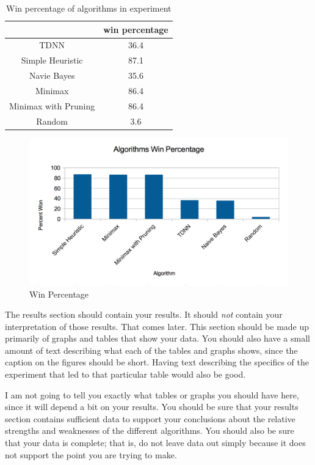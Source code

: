 \documentclass[12pt,letterpaper]{article}
\begin{document}
\begin{table}
\begin{center}
\begin{tabular}{|c||c|}
\hline
& win percentage\\
\hline \hline
TDNN & 36.4\\
\hline 
Simple Heuristic & 87.1\\
\hline 
Navie Bayes & 35.6\\
\hline 
Minimax & 86.4\\
\hline 
Minimax with Pruning & 86.4\\
\hline 
Random & 3.6\\
\hline 
\end{tabular}
\end{center}
\caption{Win percentage of algorithms in experiment}
\label{WinPercentTable}
\end{table}

\begin{figure}
\begin{center}
\includegraphics[width=7in]{winpercent.png}
\end{center}
\caption{Win Percentage}
\label{WinGraph}
\end{figure}

The results section should contain your results.  It should \emph{not} contain
your interpretation of those results.  That comes later.  This section should be
made up primarily of graphs and tables that show your data.  You should also
have a small amount of text describing what each of the tables and graphs shows,
since the caption on the figures should be short.  Having text describing the
specifics of the experiment that led to that particular table would also be
good.  

I am not going to tell you exactly what tables or graphs you should have here,
since it will depend a bit on your results.  You should be sure that your
results section contains sufficient data to support your conclusions about the
relative strengths and weaknesses of the different algorithms.  You should also
be sure that your data is complete; that is, do not leave data out simply because
it does not support the point you are trying to make.
\end{document}
